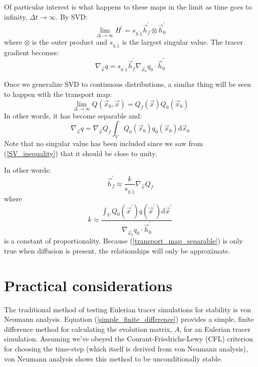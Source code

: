 \documentclass[11pt]{article}
\begin{document}
Of particular interest is what happens to these maps in the limit as time
goes to infinity, $\Delta t \rightarrow \infty$.
By SVD:
\begin{equation}
	\lim_{\Delta \rightarrow \infty} H^\prime = 
	s_{h^\prime1} \vec h_f^\prime \otimes \vec h_0^\prime
\end{equation}
where $\otimes$ is the outer product and $s_{h^\prime1}$ is the largest 
singular value. The tracer gradient becomes:
\begin{equation}
	\nabla_{\vec x} q = s_{h^\prime1} \vec h_f^\prime
	\nabla_{\vec x_0} q_0 \cdot \vec h_0^\prime
\end{equation}

Once we generalize SVD to continuous distributions, a similar thing will
be seen to happen with the transport map:
\begin{equation}
	\lim_{\Delta \rightarrow \infty} Q(\vec x_0, \vec x) =
	Q_f (\vec x) Q_0 (\vec x_0)
	\label{transport_map_separable}
\end{equation}
In other words, it has become separable and:
\begin{equation}
	\nabla_{\vec x} q = \nabla_{\vec x} Q_f \int_V Q_0 (\vec x_0) q_0 (\vec x_0) \mathrm d \vec x_0
\end{equation}
Note that no singular value has been included since we saw from
(\ref{SV_inequality}) that it should be close to unity.

In other words:
\begin{equation}
	\vec h_f^\prime \approx \frac{k}{s_{h^\prime1}} \nabla_{\vec x} Q_f
\end{equation}
where
\begin{equation}
	k \approx \frac{\int_V Q_0 (\vec x^\prime) q(\vec x^\prime) \mathrm d \vec x^\prime}
	{\nabla_{\vec x_0} q_0 \cdot \vec h_0^\prime}
\end{equation}
is a constant of proportionality.
Because (\ref{transport_map_separable}) is only true when diffusion is present,
the relationships will only be approximate.

\section{Practical considerations}

The traditional method of testing Eulerian tracer simulations for stability
is von Neumann analysis.
Equation (\ref{simple_finite_difference}) provides a simple, finite
difference method for
calculating the evolution matrix, $A$, for an Eulerian tracer simulation.
Assuming we've obeyed the Courant-Friedrichs-Lewy (CFL) criterion for choosing
the time-step (which itself is derived from von Neumann analysis), von Neumann
analysis shows this method to be unconditionally stable.
\end{document}
